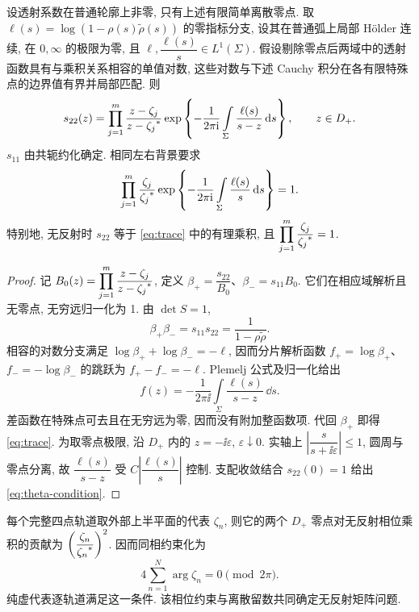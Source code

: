 \begin{proposition}\label{prop:theta}
设透射系数在普通轮廓上非零, 只有上述有限简单离散零点. 取
$\ell(s)=\log(1-\rho(s)\widetilde\rho(s))$ 的零指标分支, 设其在普通弧上局部 Hölder 连续, 在 $0,\infty$ 的极限为零, 且 $\ell,\dfrac{\ell(s)}{s}\in L^1(\Sigma)$. 假设剔除零点后两域中的透射函数具有与乘积关系相容的单值对数, 这些对数与下述 Cauchy 积分在各有限特殊点的边界值有界并局部匹配. 则
\begin{equation}\label{eq:trace}
s_{22}(z)=\prod\limits_{j=1}^{m}\dfrac{z-\zeta_j}{z-{\zeta_j}^{*}}
\exp\left\{-\dfrac{1}{2\pi\mathrm{i}}\int\limits_\Sigma\dfrac{\ell(s)}{s-z}\,\mathrm{d} s\right\},\qquad z\in D_+.
\end{equation}
$s_{11}$ 由共轭约化确定. 相同左右背景要求
\begin{equation}\label{eq:theta-condition}
\prod\limits_{j=1}^{m}\dfrac{\zeta_j}{{\zeta_j}^{*}}
\exp\left\{-\dfrac{1}{2\pi\mathrm{i}}\int\limits_\Sigma\dfrac{\ell(s)}{s}\,\mathrm{d} s\right\}=1.
\end{equation}
特别地, 无反射时 $s_{22}$ 等于 \eqref{eq:trace} 中的有理乘积, 且 $\displaystyle\prod\limits_{j=1}^{m}\dfrac{\zeta_j}{{\zeta_j}^{*}}=1$.
\end{proposition}
\begin{proof}
记 $B_0(z)=\displaystyle\prod\limits_{j=1}^{m}\dfrac{z-\zeta_j}{z-{\zeta_j}^{*}}$, 定义
$\beta_+=\dfrac{s_{22}}{B_0}$、$\beta_-=s_{11}B_0$. 它们在相应域解析且无零点, 无穷远归一化为 1. 由 $\det S=1$,
\begin{equation*}
\beta_+\beta_-=s_{11}s_{22}=\dfrac{1}{1-\rho\widetilde\rho}.
\end{equation*}
相容的对数分支满足 $\log\beta_++\log\beta_-=-\ell$, 因而分片解析函数 $f_+=\log\beta_+$、$f_-=-\log\beta_-$ 的跳跃为 $f_+-f_-=-\ell$. Plemelj 公式及归一化给出
\begin{equation*}
f(z)=-\dfrac{1}{2\pi\ii}\int\limits_\Sigma\dfrac{\ell(s)}{s-z}\,\dd s.
\end{equation*}
差函数在特殊点可去且在无穷远为零, 因而没有附加整函数项. 代回 $\beta_+$ 即得 \eqref{eq:trace}. 为取零点极限, 沿 $D_+$ 内的 $z=-\ii\varepsilon$, $\varepsilon\downarrow0$. 实轴上 $\left|\dfrac{s}{s+\ii\varepsilon}\right|\le1$, 圆周与零点分离, 故 $\dfrac{\ell(s)}{s-z}$ 受 $C\left|\dfrac{\ell(s)}{s}\right|$ 控制. 支配收敛结合 $s_{22}(0)=1$ 给出 \eqref{eq:theta-condition}.
\end{proof}

每个完整四点轨道取外部上半平面的代表 $\zeta_n$, 则它的两个 $D_+$ 零点对无反射相位乘积的贡献为 $\left(\dfrac{\zeta_n}{{\zeta_n}^{*}}\right)^2$. 因而同相约束化为
\begin{equation*}
4\sum\limits_{n=1}^{N}\arg\zeta_n=0\pmod{2\pi}.
\end{equation*}
纯虚代表逐轨道满足这一条件. 该相位约束与离散留数共同确定无反射矩阵问题.

